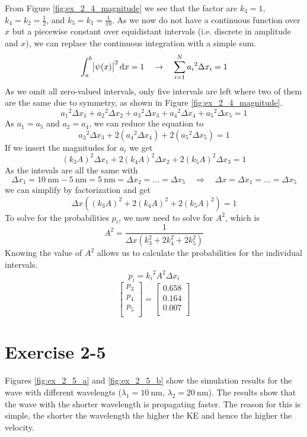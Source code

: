 From Figure \ref{fig:ex_2_4_magnitude} we see that the factor are
$k_3 = 1$, $k_4=k_2=\frac{1}{2}$, and $k_5=k_1=\frac{1}{10}$.
As we now do not have a continuous function over $x$ but a piecewise
constant over equidistant intervals (i.e. discrete in amplitude and $x$),
we can replace the continuous integration with a simple sum.
\[
	\int_a^b \abs{\psi(x)}^2 \dif x = 1
	\quad \rightarrow \quad
	\sum_{i=1}^{N} {a_i}^2 \Delta x_i = 1
\]
As we omit all zero-valued intervals, only five intervals are left where two
of them are the same due to symmetry, as shown in Figure
\ref{fig:ex_2_4_magnitude}.
\[
	{a_1}^2 \Delta x_1 + {a_2}^2 \Delta x_2 + {a_3}^2 \Delta x_3 + {a_4}^2 \Delta x_4 + {a_5}^2 \Delta x_5 = 1
\]
As $a_1 = a_5$ and $a_2 = a_4$, we can reduce the equation to
\[
	{a_3}^2 \Delta x_3 + 2 \left({a_4}^2 \Delta x_4\right) + 2 \left({a_5}^2 \Delta x_5\right) = 1
\]
If we insert the magnitudes for $a_i$ we get
\[
	\left(k_3A\right)^2 \Delta x_1 + 2 \left(k_4A\right)^2 \Delta x_2 + 2 \left(k_5A\right)^2 \Delta x_3 = 1
\]
As the intevals are all the same with
\[
	\Delta x_1
	= \SI{10}{\nano\m} - \SI{5}{\nano\m}
	= \SI{5}{\nano\m}
	= \Delta x_2 = \dots = \Delta x_5
	\quad \Rightarrow \quad 
	\Delta x = \Delta x_1 = \dots = \Delta x_5
\]
we can simplify by factorization and get
\[
	\Delta x \left( \left(k_3A\right)^2 + 2 \left(k_4A\right)^2 + 2 \left(k_5A\right)^2 \right) = 1
\]
To solve for the probabilities $p_i$, we now need to solve for $A^2$, which is
\[
	A^2 = \frac{1}{\Delta x \left(k_3^2 + 2 k_4^2 + 2 k_5^2\right)}
\]
Knowing the value of $A^2$ allows us to calculate the probabilities for the
individual intervals.
\[
	p_i = {k_i}^2 A^2 \Delta x_i
\]
\[
	\begin{bmatrix}
		p_3 \\
		p_4 \\
		p_5 \\
	\end{bmatrix}
	=
	\begin{bmatrix}
		0.658 \\
		0.164 \\
		0.007 \\
	\end{bmatrix}	
\]




\newpage
\section{Exercise 2-5}

Figures \ref{fig:ex_2_5_a} and \ref{fig:ex_2_5_b} show the simulation results
for the wave with different wavelengts ($\lambda_1 = \SI{10}{\nano\m}$,
$\lambda_2 = \SI{20}{\nano\m}$). The results show that the wave with the
shorter wavelength is propagating faster. The reason for this is simple, the
shorter the wavelength the higher the KE and hence the higher the velocity.

